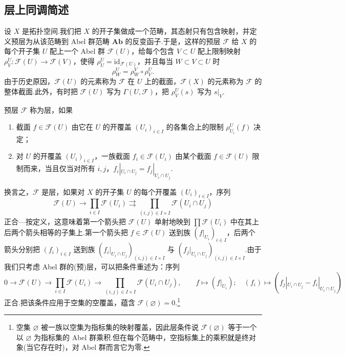 \subsection*{层上同调简述}

设 $X$ 是拓扑空间.我们把 $X$ 的开子集做成一个范畴，其态射只有包含映射，并定义预层为从该范畴到 Abel 群范畴 $\mathbf{Ab}$ 的反变函子.于是，这样的预层 $\mathcal{F}$ 给 $X$ 的每个开子集 $U$ 配上一个 Abel 群 $\mathcal{F}(U)$，给每个包含 $V \subset U$ 配上限制映射 $\rho^{U}_{V} \colon \mathcal{F}(U) \to \mathcal{F}(V)$，使得 $\rho^{U}_{U} = \mathrm{id}_{\mathcal{F}(U)}$，并且每当 $W \subset V \subset U$ 时
\[
\rho^{U}_{W} = \rho^{V}_{W} \circ \rho^{U}_{V}.
\]
由于历史原因，$\mathcal{F}(U)$ 的元素称为 $\mathcal{F}$ 在 $U$ 上的截面，$\mathcal{F}(X)$ 的元素称为 $\mathcal{F}$ 的整体截面.此外，有时把 $\mathcal{F}(U)$ 写为 $\Gamma(U, \mathcal{F})$，把 $\rho^{U}_{V}(s)$ 写为 $s|_{V}$.

预层 $\mathcal{F}$ 称为层，如果
\begin{enumerate}
  \item 截面 $f \in \mathcal{F}(U)$ 由它在 $U$ 的开覆盖 $(U_i)_{i \in I}$ 的各集合上的限制 $\rho^{U}_{U_i}(f)$ 决定；
  \item 对 $U$ 的开覆盖 $(U_i)_{i \in I}$，一族截面 $f_i \in \mathcal{F}(U_i)$ 由某个截面 $f \in \mathcal{F}(U)$ 限制而来，当且仅当对所有 $i, j$，$f_i|_{U_i \cap U_j} = f_j|_{U_i \cap U_j}$.
\end{enumerate}
换言之，$\mathcal{F}$ 是层，如果对 $X$ 的开子集 $U$ 的每个开覆盖 $(U_i)_{i \in I}$，序列
\[
\mathcal{F}(U) \to \prod_{i \in I} \mathcal{F}(U_i) \rightrightarrows \prod_{(i,j) \in I \times I} \mathcal{F}(U_i \cap U_j)
\]
正合---按定义，这意味着第一个箭头把 $\mathcal{F}(U)$ 单射地映到 $\prod \mathcal{F}(U_i)$ 中在其上后两个箭头相等的子集上.第一个箭头把 $f \in \mathcal{F}(U)$ 送到族 $(f|_{U_i})_{i \in I}$，后两个箭头分别把 $(f_i)_{i \in I}$ 送到族 $(f_i|_{U_i \cap U_j})_{(i,j) \in I \times I}$ 与 $(f_j|_{U_i \cap U_j})_{(i,j) \in I \times I}$.由于我们只考虑 Abel 群的(预)层，可以把条件重述为：序列
\[
0 \to \mathcal{F}(U) \to \prod_{i \in I} \mathcal{F}(U_i) \to \prod_{(i,j) \in I \times I} \mathcal{F}(U_i \cap U_j), \qquad
f \mapsto (f|_{U_i}); \quad (f_i) \mapsto (f_j|_{U_i \cap U_j} - f_i|_{U_i \cap U_j})
\]
正合.把该条件应用于空集的空覆盖，蕴含 $\mathcal{F}(\varnothing) = 0$.\footnote{空集 $\varnothing$ 被一族以空集为指标集的映射覆盖，因此层条件说 $\mathcal{F}(\varnothing)$ 等于一个以 $\varnothing$ 为指标集的 Abel 群乘积.但在每个范畴中，空指标集上的乘积就是终对象(当它存在时)，对 Abel 群而言它为零.}


